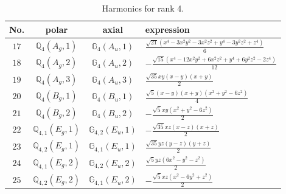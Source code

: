 \documentclass[fleqn,8pt,landscape]{jsarticle}
\begin{document}
\begin{table}[ht!]
\begin{center}
\caption{Harmonics for rank 4.}
\renewcommand{\arraystretch}{1.3}
\begin{tabular}{cccl} \hline \hline
No. & polar & axial & expression \\ \hline
$ 17 $ & $ \mathbb{Q}_{4}(A_{g},1) $ & $ \mathbb{G}_{4}(A_{u},1) $ & $ \frac{\sqrt{21} \left(x^{4} - 3 x^{2} y^{2} - 3 x^{2} z^{2} + y^{4} - 3 y^{2} z^{2} + z^{4}\right)}{6} $ \\
$ 18 $ & $ \mathbb{Q}_{4}(A_{g},2) $ & $ \mathbb{G}_{4}(A_{u},2) $ & $ - \frac{\sqrt{15} \left(x^{4} - 12 x^{2} y^{2} + 6 x^{2} z^{2} + y^{4} + 6 y^{2} z^{2} - 2 z^{4}\right)}{12} $ \\
$ 19 $ & $ \mathbb{Q}_{4}(A_{g},3) $ & $ \mathbb{G}_{4}(A_{u},3) $ & $ \frac{\sqrt{35} x y \left(x - y\right) \left(x + y\right)}{2} $ \\
$ 20 $ & $ \mathbb{Q}_{4}(B_{g},1) $ & $ \mathbb{G}_{4}(B_{u},1) $ & $ \frac{\sqrt{5} \left(x - y\right) \left(x + y\right) \left(x^{2} + y^{2} - 6 z^{2}\right)}{4} $ \\
$ 21 $ & $ \mathbb{Q}_{4}(B_{g},2) $ & $ \mathbb{G}_{4}(B_{u},2) $ & $ - \frac{\sqrt{5} x y \left(x^{2} + y^{2} - 6 z^{2}\right)}{2} $ \\
$ 22 $ & $ \mathbb{Q}_{4,1}(E_{g},1) $ & $ \mathbb{G}_{4,2}(E_{u},1) $ & $ - \frac{\sqrt{35} x z \left(x - z\right) \left(x + z\right)}{2} $ \\
$ 23 $ & $ \mathbb{Q}_{4,2}(E_{g},1) $ & $ \mathbb{G}_{4,1}(E_{u},1) $ & $ \frac{\sqrt{35} y z \left(y - z\right) \left(y + z\right)}{2} $ \\
$ 24 $ & $ \mathbb{Q}_{4,1}(E_{g},2) $ & $ \mathbb{G}_{4,2}(E_{u},2) $ & $ \frac{\sqrt{5} y z \left(6 x^{2} - y^{2} - z^{2}\right)}{2} $ \\
$ 25 $ & $ \mathbb{Q}_{4,2}(E_{g},2) $ & $ \mathbb{G}_{4,1}(E_{u},2) $ & $ - \frac{\sqrt{5} x z \left(x^{2} - 6 y^{2} + z^{2}\right)}{2} $ \\
 \hline \hline
\end{tabular}
\end{center}
\end{table}
\end{document}
